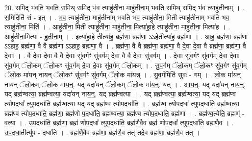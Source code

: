 \documentclass[17pt]{extarticle}
\begin{document}
20. स॒मिद् भ॑वति भवति स॒मिथ् स॒मिद् भ॑व॒ त्याहु॑तीना॒ माहु॑तीनाम् भवति स॒मिथ् स॒मिद् भ॑व॒ त्याहु॑तीनाम् । . स॒मिदिति॑ सं - इत् । . भ॒व॒ त्याहु॑तीना॒ माहु॑तीनाम् भवति भव॒ त्याहु॑तीना॒ मिती त्याहु॑तीनाम् भवति भव॒ त्याहु॑तीना॒ मिति॑ । . आहु॑तीना॒ मिती त्याहु॑तीना॒ माहु॑तीना॒ मित्या॑हा॒हे त्याहु॑तीना॒ माहु॑तीना॒ मित्या॑ह । . आहु॑तीना॒मित्या - हु॒ती॒ना॒म् । . इत्या॑हा॒हे तीत्या॑ह॒ ब्रह्म॑णा॒ ब्रह्म॑णा॒ ऽऽहेतीत्या॑ह॒ ब्रह्म॑णा । . आ॒ह॒ ब्रह्म॑णा॒ ब्रह्म॑णा ऽऽहाह॒ ब्रह्म॑णा॒ वै वै ब्रह्म॑णा ऽऽहाह॒ ब्रह्म॑णा॒ वै । . ब्रह्म॑णा॒ वै वै ब्रह्म॑णा॒ ब्रह्म॑णा॒ वै दे॒वा दे॒वा वै ब्रह्म॑णा॒ ब्रह्म॑णा॒ वै दे॒वाः । . वै दे॒वा दे॒वा वै वै दे॒वाः सु॑व॒र्गꣳ सु॑व॒र्गम् दे॒वा वै वै दे॒वाः सु॑व॒र्गम् । . दे॒वाः सु॑व॒र्गꣳ सु॑व॒र्गम् दे॒वा दे॒वाः सु॑व॒र्गम् ॅलो॒कम् ॅलो॒कꣳ सु॑व॒र्गम् दे॒वा दे॒वाः सु॑व॒र्गम् ॅलो॒कम् । . सु॒व॒र्गम् ॅलो॒कम् ॅलो॒कꣳ सु॑व॒र्गꣳ सु॑व॒र्गम् ॅलो॒क मा॑यन् नायन् ॅलो॒कꣳ सु॑व॒र्गꣳ सु॑व॒र्गम् ॅलो॒क मा॑यन्न् । . सु॒व॒र्गमिति॑ सुवः - गम् । . लो॒क मा॑यन् नायन् ॅलो॒कम् ॅलो॒क मा॑य॒न्॒. यद् यदा॑यन् ॅलो॒कम् ॅलो॒क मा॑य॒न्॒. यत् । . आ॒य॒न्॒. यद् यदा॑यन् नाय॒न्॒. यद् ब्रह्म॑ण्वत्या॒ ब्रह्म॑ण्वत्या॒ यदा॑यन् नाय॒न्॒. यद् ब्रह्म॑ण्वत्या । . यद् ब्रह्म॑ण्वत्या॒ ब्रह्म॑ण्वत्या॒ यद् यद् ब्रह्म॑ण्व त्योप॒दधा᳚ त्युप॒दधा॑ति॒ ब्रह्म॑ण्वत्या॒ यद् यद् ब्रह्म॑ण्व त्योप॒दधा॑ति । . ब्रह्म॑ण्व त्योप॒दधा᳚ त्युप॒दधा॑ति॒ ब्रह्म॑ण्वत्या॒ ब्रह्म॑ण्व त्योप॒दधा॑ति॒ ब्रह्म॑णा॒ ब्रह्म॑णो प॒दधा॑ति॒ ब्रह्म॑ण्वत्या॒ ब्रह्म॑ण्व त्योप॒दधा॑ति॒ ब्रह्म॑णा । . ब्रह्म॑ण्व॒त्येति॒ ब्रह्मण्॑ - व॒त्या॒ । . उ॒प॒दधा॑ति॒ ब्रह्म॑णा॒ ब्रह्म॑ णोप॒दधा᳚ त्युप॒दधा॑ति॒ ब्रह्म॑णै॒वैव ब्रह्म॑ णोप॒दधा᳚ त्युप॒दधा॑ति॒ ब्रह्म॑णै॒व । . उ॒प॒दधा॒तीत्यु॑प - दधा॑ति । . ब्रह्म॑णै॒वैव ब्रह्म॑णा॒ ब्रह्म॑णै॒व तत् तदे॒व ब्रह्म॑णा॒ ब्रह्म॑णै॒व तत् । \newline
\end{document}
